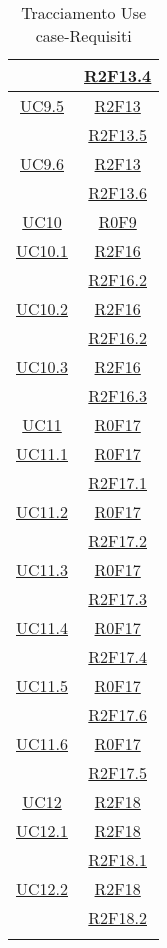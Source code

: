 \begin{longtable}{|c|c|}
& \hyperlink{R2F13.4}{R2F13.4}\\
\hline
\hyperlink{UC9.5}{UC9.5} & \hyperlink{R2F13}{R2F13}\\
& \hyperlink{R2F13.5}{R2F13.5}\\
\hline
\hyperlink{UC9.6}{UC9.6} & \hyperlink{R2F13}{R2F13}\\
& \hyperlink{R2F13.6}{R2F13.6}\\
\hline
\hyperlink{UC10}{UC10} & \hyperlink{R0F9}{R0F9}\\
\hline
\hyperlink{UC10.1}{UC10.1} & \hyperlink{R2F16}{R2F16}\\
& \hyperlink{R2F16.2}{R2F16.2}\\
\hline
\hyperlink{UC10.2}{UC10.2} & \hyperlink{R2F16}{R2F16}\\
& \hyperlink{R2F16.2}{R2F16.2}\\
\hline
\hyperlink{UC10.3}{UC10.3} & \hyperlink{R2F16}{R2F16}\\
& \hyperlink{R2F16.3}{R2F16.3}\\
\hline
\hyperlink{UC11}{UC11} & \hyperlink{R0F17}{R0F17}\\
\hline
\hyperlink{UC11.1}{UC11.1} & \hyperlink{R0F17}{R0F17}\\
& \hyperlink{R2F17.1}{R2F17.1}\\
\hline
\hyperlink{UC11.2}{UC11.2} & \hyperlink{R0F17}{R0F17}\\
& \hyperlink{R2F17.2}{R2F17.2}\\
\hline
\hyperlink{UC11.3}{UC11.3} & \hyperlink{R0F17}{R0F17}\\
& \hyperlink{R2F17.3}{R2F17.3}\\
\hline
\hyperlink{UC11.4}{UC11.4} & \hyperlink{R0F17}{R0F17}\\
& \hyperlink{R2F17.4}{R2F17.4}\\
\hline
\hyperlink{UC11.5}{UC11.5} & \hyperlink{R0F17}{R0F17}\\
& \hyperlink{R2F17.6}{R2F17.6}\\
\hline
\hyperlink{UC11.6}{UC11.6} & \hyperlink{R0F17}{R0F17}\\
& \hyperlink{R2F17.5}{R2F17.5}\\
\hline
\hyperlink{UC12}{UC12} & \hyperlink{R2F18}{R2F18}\\
\hline
\hyperlink{UC12.1}{UC12.1} & \hyperlink{R2F18}{R2F18}\\
& \hyperlink{R2F18.1}{R2F18.1}\\
\hline
\hyperlink{UC12.2}{UC12.2} & \hyperlink{R2F18}{R2F18}\\
& \hyperlink{R2F18.2}{R2F18.2}\\
\hline
\caption[Tracciamento Use case-Requisiti]{Tracciamento Use case-Requisiti}
\label{tabella:requi-usecase}
\end{longtable}
\clearpage
